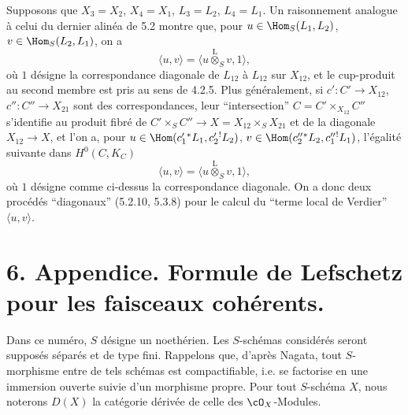 Supposons que $X_3=X_2$, $X_4=X_1$, $L_3=L_2$, $L_4=L_1$. Un raisonnement analogue à celui du dernier alinéa de 5.2 montre que, pour $u\in\Hom_S(L_1,L_2)$, $v\in\Hom_S(L_2,L_1)$, on a
\begin{equation}
\tag{5.3.7}
\langle u,v\rangle=\langle u\overset{\mathrm{L}}{\otimes}_Sv,1\rangle,
\end{equation}
où $1$ désigne la correspondance diagonale de $L_{12}$ à $L_{12}$ sur $X_{12}$, et le cup-produit au second membre est pris au sens de 4.2.5. Plus généralement, si $c':C'\to X_{12}$, $c'':C''\to X_{21}$ sont des correspondances, leur ``intersection'' $C=C'\times_{X_{12}}C''$ s'identifie au produit fibré de $C'\times_SC''\to X=X_{12}\times_SX_{21}$ et de la diagonale $X_{12}\to X$, et l'on a, pour $u\in\Hom(c_1'{}^*L_1,c_2'{}^!L_2)$, $v\in\Hom(c_2''{}^*L_2,c_1''{}^!L_1)$, l'égalité suivante dans $H^0(C,K_C)$
\begin{equation}
\tag{5.3.8}
\langle u,v\rangle=\langle u\overset{\mathrm{L}}{\otimes}_Sv,1\rangle,
\end{equation}
où $1$ désigne comme ci-dessus la correspondance diagonale. On a donc deux procédés ``diagonaux'' (5.2.10, 5.3.8) pour le calcul du ``terme local de Verdier'' $\langle u,v\rangle$.

\section*{6. Appendice. Formule de Lefschetz pour les faisceaux cohérents.}

Dans ce numéro, $S$ désigne un  noethérien. Les $S$-schémas considérés seront supposés séparés et de type fini. Rappelons que, d'après Nagata, tout $S$-morphisme entre de tels schémas est compactifiable, i.e. se factorise en une immersion ouverte suivie d'un morphisme propre. Pour tout $S$-schéma $X$, nous noterons $D(X)$ la catégorie dérivée de celle des $\cO_X$-Modules.

